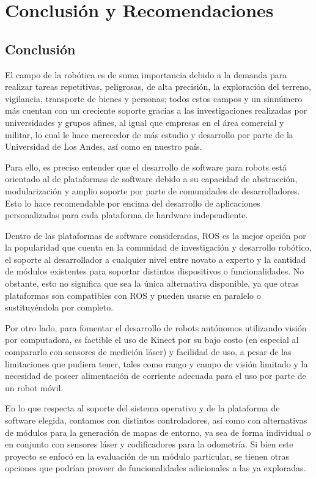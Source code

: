 \chapter{Conclusión y Recomendaciones}

\section{Conclusión}

El campo de la robótica es de suma importancia debido a la demanda para realizar tareas repetitivas, peligrosas, de alta precisión, la exploración del terreno, vigilancia, transporte de bienes y personas; todos estos campos y un sinnúmero más cuentan con un creciente soporte gracias a las investigaciones realizadas por universidades y grupos afines, al igual que empresas en el área comercial y militar, lo cual le hace merecedor de más estudio y desarrollo por parte de la Universidad de Los Andes, así como en nuestro país.

Para ello, es preciso entender que el desarrollo de software para robots está orientado al de plataformas de software debido a su capacidad de abstracción, modularización y amplio soporte por parte de comunidades de desarrolladores. Esto lo hace recomendable por encima del desarrollo de aplicaciones personalizadas para cada plataforma de hardware independiente.

Dentro de las plataformas de software consideradas, ROS es la mejor opción por la popularidad que cuenta en la comunidad de investigación y desarrollo robótico, el soporte al desarrollador a cualquier nivel entre novato a experto y la cantidad de módulos existentes para soportar distintos dispositivos o funcionalidades. No obstante, esto no significa que sea la única alternativa disponible, ya que otras plataformas son compatibles con ROS y pueden usarse en paralelo o sustituyéndola por completo.

Por otro lado, para fomentar el desarrollo de robots autónomos utilizando visión por computadora, es factible el uso de Kinect por su bajo costo (en especial al compararlo con sensores de medición láser) y facilidad de uso, a pesar de las limitaciones que pudiera tener, tales como rango y campo de visión limitado y la necesidad de poseer alimentación de corriente adecuada para el uso por parte de un robot móvil.

En lo que respecta al soporte del sistema operativo y de la plataforma de software elegida, contamos con distintos controladores, así como con alternativas de módulos para la generación de mapas de entorno, ya sea de forma individual o en conjunto con sensores láser y codificadores para la odometría. Si bien este proyecto se enfocó en la evaluación de un módulo particular, se tienen otras opciones que podrían proveer de funcionalidades adicionales a las ya exploradas.

